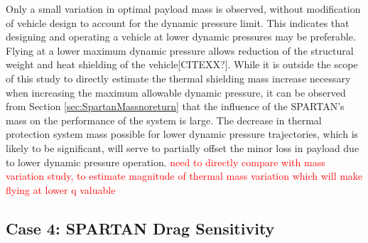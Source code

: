 Only a small variation in optimal payload mass is observed, without modification of vehicle design to account for the dynamic pressure limit. This indicates that designing and operating a vehicle at lower dynamic pressures may be preferable. Flying at a lower maximum dynamic pressure allows reduction of the structural weight and heat shielding of the vehicle[CITEXX?]. 
While it is outside the scope of this study to directly estimate the thermal shielding mass increase necessary when increasing the maximum allowable dynamic pressure, it can be observed from Section \ref{sec:SpartanMassnoreturn} that the influence of the SPARTAN's mass on the performance of the system is large. The decrease in thermal protection system mass possible for lower dynamic pressure trajectories, which is likely to be significant, will serve to partially offset the minor loss in payload due to lower dynamic pressure operation. 
\textcolor{red}{need to directly compare with mass variation study, to estimate magnitude of thermal mass variation which will make flying at lower q valuable}

\subsection{Case 4: SPARTAN Drag Sensitivity}\label{sec:dragvariation}

